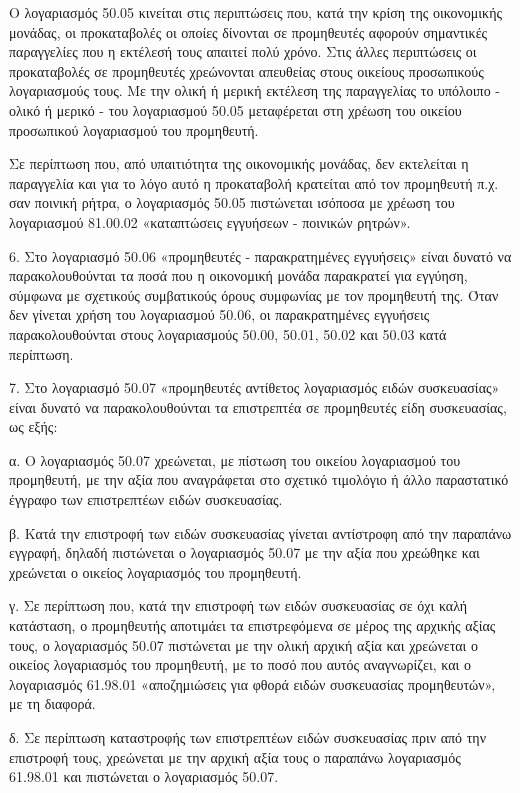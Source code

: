 \documentclass[A4,10pt,greek]{book}
\begin{document}
Ο λογαριασμός 50.05 κινείται στις περιπτώσεις που, κατά την κρίση της οικονομικής μονάδας, οι προκαταβολές οι οποίες δίνονται σε προμηθευτές αφορούν σημαντικές παραγγελίες που η εκτέλεσή τους απαιτεί πολύ χρόνο. Στις άλλες περιπτώσεις οι προκαταβολές σε προμηθευτές χρεώνονται απευθείας στους οικείους προσωπικούς λογαριασμούς τους. Με την ολική ή μερική εκτέλεση της παραγγελίας το υπόλοιπο - ολικό ή μερικό - του λογαριασμού 50.05 μεταφέρεται στη χρέωση του οικείου προσωπικού λογαριασμού του προμηθευτή.

Σε περίπτωση που, από υπαιτιότητα της οικονομικής μονάδας, δεν εκτελείται η παραγγελία και για το λόγο αυτό η προκαταβολή κρατείται από τον προμηθευτή π.χ.  σαν ποινική ρήτρα, ο λογαριασμός 50.05 πιστώνεται ισόποσα με χρέωση του λογαριασμού 81.00.02 «καταπτώσεις εγγυήσεων - ποινικών ρητρών».

6. Στο λογαριασμό 50.06 «προμηθευτές - παρακρατημένες εγγυήσεις» είναι δυνατό να παρακολουθούνται τα ποσά που η οικονομική μονάδα παρακρατεί για εγγύηση, σύμφωνα με σχετικούς συμβατικούς όρους συμφωνίας με τον προμηθευτή της. Όταν δεν γίνεται χρήση του λογαριασμού 50.06, οι παρακρατημένες εγγυήσεις παρακολουθούνται στους λογαριασμούς 50.00, 50.01, 50.02 και 50.03 κατά περίπτωση.

7. Στο λογαριασμό 50.07 «προμηθευτές αντίθετος λογαριασμός ειδών συσκευασίας» είναι δυνατό να παρακολουθούνται τα επιστρεπτέα σε προμηθευτές είδη συσκευασίας, ως εξής:

α. Ο λογαριασμός 50.07 χρεώνεται, με πίστωση του οικείου λογαριασμού του προμηθευτή, με την αξία που αναγράφεται στο σχετικό τιμολόγιο ή άλλο παραστατικό έγγραφο των επιστρεπτέων ειδών συσκευασίας.

β. Κατά την επιστροφή των ειδών συσκευασίας γίνεται αντίστροφη από την παραπάνω εγγραφή, δηλαδή πιστώνεται ο λογαριασμός 50.07 με την αξία που χρεώθηκε και χρεώνεται ο οικείος λογαριασμός του προμηθευτή.

γ. Σε περίπτωση που, κατά την επιστροφή των ειδών συσκευασίας σε όχι καλή κατάσταση, ο προμηθευτής αποτιμάει τα επιστρεφόμενα σε μέρος της αρχικής αξίας τους, ο λογαριασμός 50.07 πιστώνεται με την ολική αρχική αξία και χρεώνεται ο οικείος λογαριασμός του προμηθευτή, με το ποσό που αυτός αναγνωρίζει, και ο λογαριασμός 61.98.01 «αποζημιώσεις για φθορά ειδών συσκευασίας προμηθευτών», με τη διαφορά.

δ. Σε περίπτωση καταστροφής των επιστρεπτέων ειδών συσκευασίας πριν από την επιστροφή τους, χρεώνεται με την αρχική αξία τους ο παραπάνω λογαριασμός 61.98.01 και πιστώνεται ο λογαριασμός 50.07.
\end{document}
